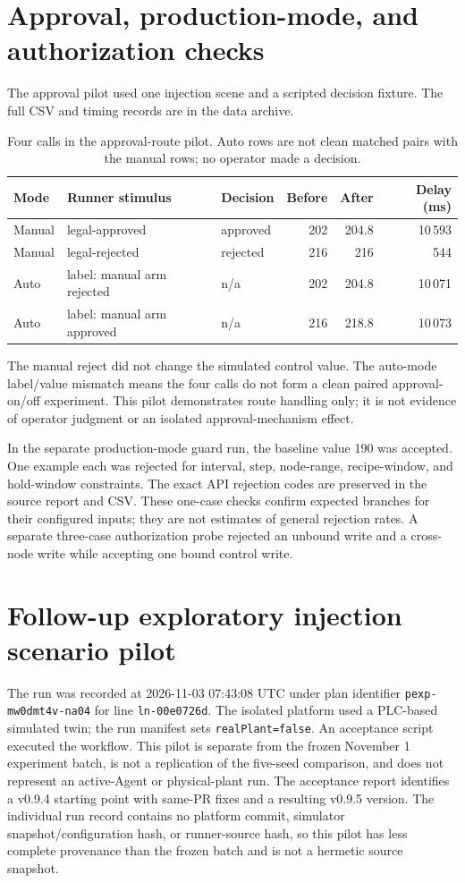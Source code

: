 \documentclass[10pt]{article}
\begin{document}
\section*{Approval, production-mode, and authorization checks}
The approval pilot used one injection scene and a scripted decision fixture. The full CSV and timing records are in the data archive.

\begin{table}[h]
\centering
\caption{Four calls in the approval-route pilot. Auto rows are not clean matched pairs with the manual rows; no operator made a decision.}
\begin{tabularx}{\textwidth}{@{}l X l r r r@{}}
\toprule
Mode & Runner stimulus & Decision & Before & After & Delay (ms) \\
\midrule
Manual & legal-approved & approved & 202 & 204.8 & 10\,593 \\
Manual & legal-rejected & rejected & 216 & 216 & 544 \\
Auto & label: manual arm rejected & n/a & 202 & 204.8 & 10\,071 \\
Auto & label: manual arm approved & n/a & 216 & 218.8 & 10\,073 \\
\bottomrule
\end{tabularx}
\end{table}

The manual reject did not change the simulated control value. The auto-mode label/value mismatch means the four calls do not form a clean paired approval-on/off experiment. This pilot demonstrates route handling only; it is not evidence of operator judgment or an isolated approval-mechanism effect.

In the separate production-mode guard run, the baseline value 190 was accepted. One example each was rejected for interval, step, node-range, recipe-window, and hold-window constraints. The exact API rejection codes are preserved in the source report and CSV. These one-case checks confirm expected branches for their configured inputs; they are not estimates of general rejection rates. A separate three-case authorization probe rejected an unbound write and a cross-node write while accepting one bound control write.

\section*{Follow-up exploratory injection scenario pilot}
The run was recorded at 2026-11-03 07:43:08 UTC under plan identifier
\texttt{pexp-mw0dmt4v-na04} for line \texttt{ln-00e0726d}. The isolated
platform used a PLC-based simulated twin; the run manifest sets
\texttt{realPlant=false}. An acceptance script executed the workflow. This
pilot is separate from the frozen November 1 experiment batch, is not a
replication of the five-seed comparison, and does not represent an active-Agent
or physical-plant run.
The acceptance report identifies a v0.9.4 starting point with same-PR fixes
and a resulting v0.9.5 version. The individual run record contains no platform
commit, simulator snapshot/configuration hash, or runner-source hash, so this
pilot has less complete provenance than the frozen batch and is not a
hermetic source snapshot.
\end{document}
